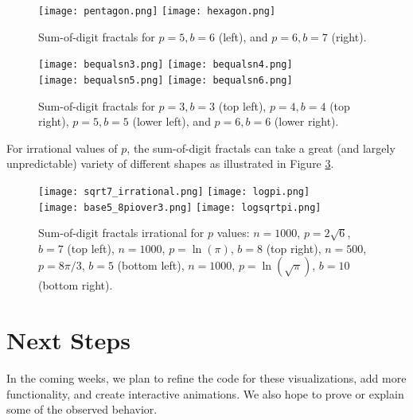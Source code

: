 \documentclass[12pt]{article}
\begin{document}
        

\begin{figure}[htb!]

    \begin{center}
    \texttt{[image: pentagon.png]} 
    \hspace{0.2in} \texttt{[image: hexagon.png]}
    \end{center}
    \caption{Sum-of-digit fractals for $p = 5, b = 6$ (left), and $p = 6, b = 7$ (right).}
    \label{fig:p-gons}
    \end{figure}

\begin{figure}[htb!]
    \begin{center}
    \texttt{[image: bequalsn3.png]}
    \hspace{0.2in} \texttt{[image: bequalsn4.png]}
    \\
    \texttt{[image: bequalsn5.png]}
    \hspace{0.2in} \texttt{[image: bequalsn6.png]}
    \end{center}
    \caption{Sum-of-digit fractals for $p = 3, b = 3$ (top left), $p = 4, b = 4$ (top right),
    $p = 5, b = 5$ (lower left), and $p = 6, b = 6$ (lower right).}
    \label{fig:multiple-p-gons}
\end{figure}

\clearpage
For irrational values of $p$, the sum-of-digit fractals can take a great (and largely unpredictable) variety of different shapes  as illustrated in Figure \ref{fig:irrational}. 
\begin{figure}[htb!]
    \begin{center}
    \texttt{[image: sqrt7\_irrational.png]}
    \hspace{0.2in} \texttt{[image: logpi.png]}
    \\
    \texttt{[image: base5\_8piover3.png]}
    \hspace{0.2in} \texttt{[image: logsqrtpi.png]}
    \end{center}
    \caption{Sum-of-digit fractals irrational for $p$ values: $n = 1000$, $p = 2\sqrt{6}$, $b = 7$  (top left), $n = 1000$, $p = \ln(\pi)$, $b = 8$ (top right), $n = 500$, $p = 8\pi/3$, $b = 5$ (bottom left), $n = 1000$, $p = \ln(\sqrt{\pi})$, $b = 10$ (bottom right).}
    \label{fig:irrational}
\end{figure}

\section{Next Steps}

In the coming weeks, we plan to refine the code for these visualizations, add more functionality, and create interactive animations. We also hope to prove or explain some of the observed behavior.
\end{document}
